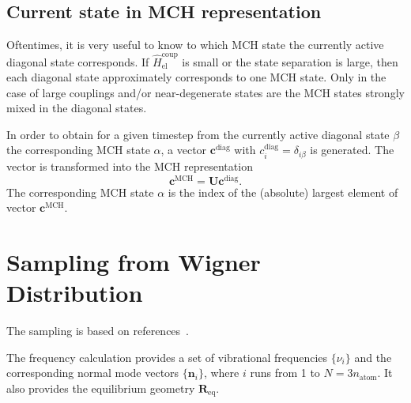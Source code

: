 \documentclass[a4paper,11pt,DIV=15,openany,twoside=false]{scrbook}
\newcommand{\VEC}[1]{\ensuremath{\mathbf{#1}}}
\begin{document}
\subsection{Current state in MCH representation}\label{ssec:state_transform}

Oftentimes, it is very useful to know to which MCH state the currently active diagonal state corresponds. If $\hat{H}_{\text{el}}^{\text{coup}}$ is small or the state separation is large, then each diagonal state approximately corresponds to one MCH state. Only in the case of large couplings and/or near-degenerate states are the MCH states strongly mixed in the diagonal states.

In order to obtain for a given timestep from the currently active diagonal state $\beta$ the corresponding MCH state $\alpha$, a vector $\VEC{c}^\text{diag}$ with $c_i^\text{diag}=\delta_{i\beta}$ is generated. The vector is transformed into the MCH representation
\begin{equation}
  \VEC{c}^\text{MCH}=\VEC{U}\VEC{c}^\text{diag}.
\end{equation}
The corresponding MCH state $\alpha$ is the index of the (absolute) largest element of vector $\VEC{c}^\text{MCH}$.


\section{Sampling from Wigner Distribution}\label{met:wigner}

The sampling is based on references~\cite{Dahl1988JCP, Schinke1995}.

The frequency calculation provides a set of vibrational frequencies $\{\nu_i\}$ and the corresponding normal mode vectors $\{\VEC{n}_i\}$, where $i$ runs from 1 to $N=3n_{\text{atom}}$. It also provides the equilibrium geometry $\VEC{R}_{\text{eq}}$.
\end{document}
